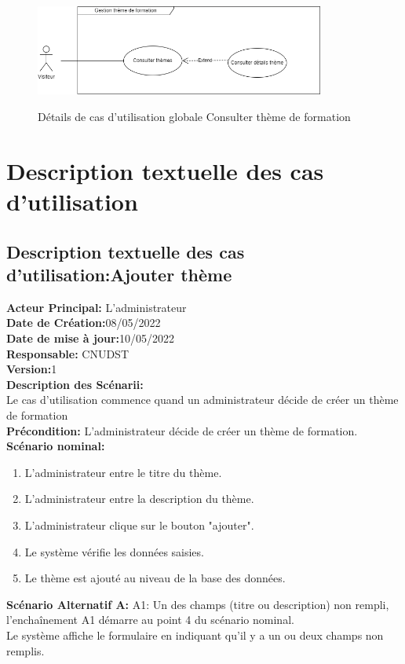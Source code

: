 \begin{itemize}
\begin{figure}[!h]
	\centering
	{\includegraphics[width=0.85\textwidth]{D) IMAGES/constheme.png}}
	\caption{Détails de cas d'utilisation globale Consulter thème de formation}
	\label{Org}
\end{figure}
\end{itemize}
\section{Description textuelle des cas d'utilisation}
\subsection{Description textuelle des cas d’utilisation:Ajouter thème}
\textbf{Acteur Principal:} L'administrateur\\
\textbf{Date de Création:}08/05/2022\\
\textbf{Date de mise à jour:}10/05/2022\\
\textbf{Responsable:} CNUDST\\
\textbf{Version:}1\\
\textbf{Description des Scénarii:}\\
Le cas d'utilisation commence quand un administrateur décide de créer un thème de formation\\
\textbf{Précondition:} L'administrateur décide de créer un thème de formation.\\
\textbf{Scénario nominal:}
\begin{enumerate}
	\item L'administrateur entre le titre du thème.
	\item L'administrateur entre la description du thème.
	\item L'administrateur clique sur le bouton "ajouter".
	\item Le système vérifie les données saisies.
	\item Le thème est ajouté au niveau de la base des données.
	
\end{enumerate}
\textbf{Scénario Alternatif A:} A1: Un des champs (titre ou description) non rempli, l'enchaînement A1 démarre au point 4 du scénario nominal.\\
Le système affiche le formulaire en indiquant qu'il y a un ou deux champs non remplis.

